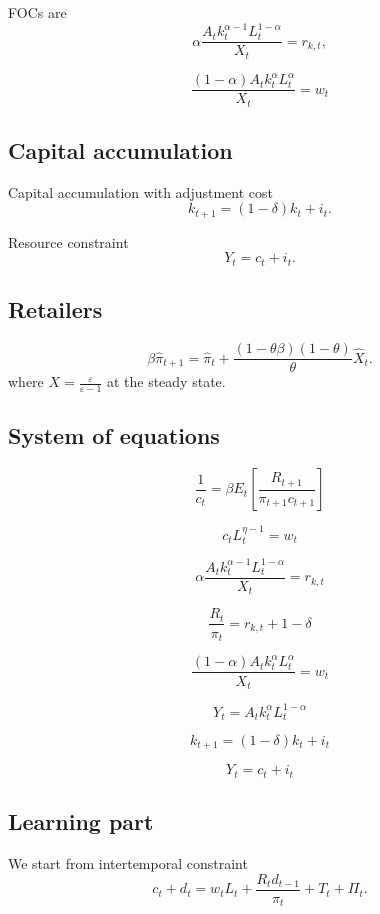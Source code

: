 \documentclass{article}
\begin{document}
FOCs are%
\begin{equation}
\alpha \frac{A_{t}k_{t}^{\alpha -1}L_{t}^{1-\alpha }}{X_{t}}=r_{k,t},
\label{MPK}
\end{equation}

\begin{equation}
\frac{\left( 1-\alpha \right) A_{t}k_{t}^{\alpha }L_{t}^{\alpha }}{X_{t}}%
=w_{t}  \label{MPL}
\end{equation}

\subsection{Capital accumulation}

Capital accumulation with adjustment cost%
\[
k_{t+1}=\left( 1-\delta \right) k_{t}+i_{t}. 
\]

Resource constraint%
\[
Y_{t}=c_{t}+i_{t}. 
\]

\subsection{Retailers}

\[
\beta \widehat{\pi }_{t+1}=\widehat{\pi }_{t}+\frac{\left( 1-\theta \beta
\right) \left( 1-\theta \right) }{\theta }\widehat{X}_{t}. 
\]%
where $X=\frac{\varepsilon }{\varepsilon -1}$ at the steady state.

\subsection{System of equations}

\[
\frac{1}{c_{t}}=\beta E_{t}\left[ \frac{R_{t+1}}{\pi _{t+1}c_{t+1}}\right] 
\]

\[
c_{t}L_{t}^{\eta -1}=w_{t} 
\]

\[
\alpha \frac{A_{t}k_{t}^{\alpha -1}L_{t}^{1-\alpha }}{X_{t}}=r_{k,t} 
\]

\[
\frac{R_{t}}{\pi _{t}}=r_{k,t}+1-\delta 
\]

\[
\frac{\left( 1-\alpha \right) A_{t}k_{t}^{\alpha }L_{t}^{\alpha }}{X_{t}}%
=w_{t} 
\]

\[
Y_{t}=A_{t}k_{t}^{\alpha }L_{t}^{1-\alpha } 
\]

\[
k_{t+1}=\left( 1-\delta \right) k_{t}+i_{t} 
\]

\[
Y_{t}=c_{t}+i_{t}
\]

\subsection{Learning part}

We start from intertemporal constraint%
\[
c_{t}+d_{t}=w_{t}L_{t}+\frac{R_{t}d_{t-1}}{\pi _{t}}+T_{t}+\Pi _{t}.
\]

\[
\]
\end{document}
